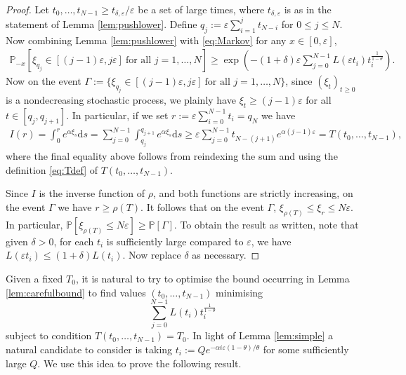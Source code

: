 \documentclass[a4,12pt]{amsart}
\numberwithin{equation}{section}
\begin{document}
	\begin{proof}
		Let $t_0,\ldots,t_{N-1} \geq t_{\delta,\varepsilon}/\varepsilon$ 
		be a set of large times, where $t_{\delta,\varepsilon}$ is as in the statement of Lemma \ref{lem:pushlower}. 
		Define $q_j := \varepsilon \sum_{i=1}^j t_{N-i}$ for $0 \leq j \leq N$. 
		Now combining Lemma \ref{lem:pushlower} with \eqref{eq:Markov} 
		for any $x \in [0,\varepsilon]$, 
		\begin{align*} 
			\mathbb{P}_{-x} \left[ \xi_{q_j } \in [(j-1)\varepsilon, j \varepsilon ] ~ 
			\text{for all $j = 1,\ldots,N$} \right]
			\geq \exp \left( -  (1 + \delta) \varepsilon 
			\sum_{ j =0}^{ N-1} L(\varepsilon t_i) t_i^{\frac{1}{1-\theta}}  \right). 
		\end{align*}
		Now on the event 
		$\Gamma := \{\xi_{q_j } \in [(j-1)\varepsilon, j \varepsilon ] ~ \text{for all $j = 1,\ldots,N$}\}$, 
		since $(\xi_t)_{t \geq 0}$ is a nondecreasing stochastic process, 
		we plainly have $\xi_t \geq (j-1)\varepsilon$ for all $t \in [q_j,q_{j+1}]$. 
		In particular, if we set $r := \varepsilon \sum_{ i = 0}^{N-1} t_i = q_N$ we have
		\begin{align*}
			I(r) = \int_0^r e^{\alpha \xi_s} \mathrm{d} s  
			= \sum_{ j = 0}^{N-1} \int_{q_j}^{q_{j+1}} e^{ \alpha \xi_s} \mathrm{d}s 
			\geq \varepsilon\sum_{j =0}^{N-1} t_{N-(j+1)} e^{ \alpha (j-1)\varepsilon } 
			= T(t_0,\ldots,t_{N-1}),
		\end{align*}
		where the final equality above follows from reindexing the sum and using the 
		definition \eqref{eq:Tdef} of $T(t_0,\ldots,t_{N-1})$. 


		Since $I$ is the inverse function of $\rho$, and both functions are strictly increasing, 
		on the event $\Gamma$ we have $r \geq \rho(T)$. It follows that on the event $\Gamma$, 
		$\xi_{\rho(T)} \leq \xi_{r} \leq N\varepsilon$. In particular, 
		$\mathbb{P} [ \xi_{\rho(T)} \leq N\varepsilon ] \geq \mathbb{P}[ \Gamma]$. 
		To obtain the result as written, note that given $\delta > 0$, for each $t_i$ 
		is sufficiently large compared to $\varepsilon$, we have 
		$L(\varepsilon t_i) \leq (1+\delta) L(t_i)$. Now replace $\delta$ as necessary. 
	\end{proof}

	Given a fixed $T_0$, it is natural to try to optimise the bound occurring 
	in Lemma \ref{lem:carefulbound} to find values $(t_0,\ldots,t_{N-1})$ minimising 
	\[
   	 \sum_{j = 0 }^{N-1} L(t_i) t_i^{\frac{1}{1-\theta}}
    	\] 
	subject to condition $T(t_0,\ldots,t_{N-1}) = T_0$. In light of Lemma \ref{lem:simple} 
	a natural candidate to consider is taking $t_i := Q e^{ - \alpha i\varepsilon(1-\theta)/\theta}$
	for some sufficiently large $Q$. We use this idea to prove the following result.
\end{document}
